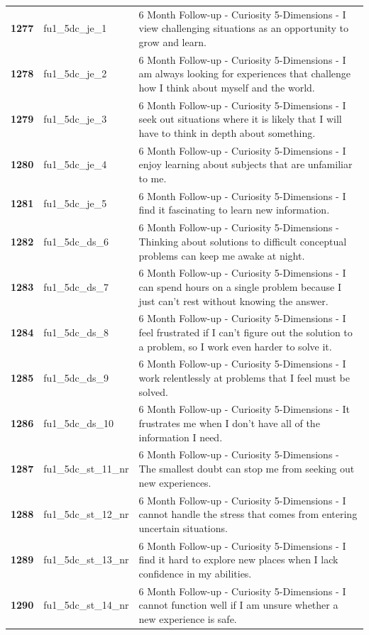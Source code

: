 \documentclass[
  letterpaper,
  DIV=11,
  numbers=noendperiod]{scrartcl}
\begin{document}
\begin{longtable}[t]{>{}cll}
\textbf{1277} & fu1\_5dc\_je\_1 & 6 Month Follow-up - Curiosity 5-Dimensions - I view challenging situations as an opportunity to grow and learn.\\
\textbf{1278} & fu1\_5dc\_je\_2 & 6 Month Follow-up - Curiosity 5-Dimensions - I am always looking for experiences that challenge how I think about myself and the world.\\
\textbf{1279} & fu1\_5dc\_je\_3 & 6 Month Follow-up - Curiosity 5-Dimensions - I seek out situations where it is likely that I will have to think in depth about something.\\
\textbf{1280} & fu1\_5dc\_je\_4 & 6 Month Follow-up - Curiosity 5-Dimensions - I enjoy learning about subjects that are unfamiliar to me.\\
\addlinespace
\textbf{1281} & fu1\_5dc\_je\_5 & 6 Month Follow-up - Curiosity 5-Dimensions - I find it fascinating to learn new information.\\
\textbf{1282} & fu1\_5dc\_ds\_6 & 6 Month Follow-up - Curiosity 5-Dimensions - Thinking about solutions to difficult conceptual problems can keep me awake at night.\\
\textbf{1283} & fu1\_5dc\_ds\_7 & 6 Month Follow-up - Curiosity 5-Dimensions - I can spend hours on a single problem because I just can't rest without knowing the answer.\\
\textbf{1284} & fu1\_5dc\_ds\_8 & 6 Month Follow-up - Curiosity 5-Dimensions - I feel frustrated if I can't figure out the solution to a problem, so I work even harder to solve it.\\
\textbf{1285} & fu1\_5dc\_ds\_9 & 6 Month Follow-up - Curiosity 5-Dimensions - I work relentlessly at problems that I feel must be solved.\\
\addlinespace
\textbf{1286} & fu1\_5dc\_ds\_10 & 6 Month Follow-up - Curiosity 5-Dimensions - It frustrates me when I don't have all of the information I need.\\
\textbf{1287} & fu1\_5dc\_st\_11\_nr & 6 Month Follow-up - Curiosity 5-Dimensions - The smallest doubt can stop me from seeking out new experiences.\\
\textbf{1288} & fu1\_5dc\_st\_12\_nr & 6 Month Follow-up - Curiosity 5-Dimensions - I cannot handle the stress that comes from entering uncertain situations.\\
\textbf{1289} & fu1\_5dc\_st\_13\_nr & 6 Month Follow-up - Curiosity 5-Dimensions - I find it hard to explore new places when I lack confidence in my abilities.\\
\textbf{1290} & fu1\_5dc\_st\_14\_nr & 6 Month Follow-up - Curiosity 5-Dimensions - I cannot function well if I am unsure whether a new experience is safe.\\

\end{longtable}
\end{document}
